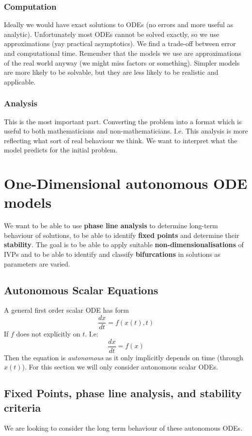 \documentclass{/home/janmebows/Documents/LatexTemplates/myassignment}
\begin{document}
\subsubsection{Computation}
Ideally we would have exact solutions to ODEs (no errors and more useful as analytic). Unfortunately most ODEs cannot be solved exactly, so we use approximations (yay practical asymptotics). We find a trade-off between error and computational time. Remember that the models we use are approximations of the real world anyway (we might miss factors or something).
Simpler models are more likely to be solvable, but they are less likely to be realistic and applicable.



\subsubsection{Analysis}
This is the most important part. Converting the problem into a format which is useful to both mathematicians and non-mathematicians. I.e. This analysis is more reflecting what sort of real behaviour we think. We want to interpret what the model predicts for the initial problem. 




\section{One-Dimensional autonomous ODE models}
We want to be able to use \textbf{phase line analysis} to determine long-term behaviour of solutions, to be able to identify \textbf{fixed points} and determine their \textbf{stability}. The goal is to be able to apply suitable \textbf{non-dimensionalisations} of IVPs and to be able to identify and classify \textbf{bifurcations} in solutions as parameters are varied.
\subsection{Autonomous Scalar Equations}
A general first order scalar ODE has form
\[\frac{dx}{dt} = f(x(t),t)\]
If $f$ does not explicitly on $t$. I.e:
\[\frac{dx}{dt} = f(x)\]
Then the equation is \textit{autonomous} as it only implicitly depends on time (through $x(t)$). For this section we will only consider autonomous scalar ODEs.






\subsection{Fixed Points, phase line analysis, and stability criteria}
We are looking to consider the long term behaviour of these autonomous ODEs.
\end{document}
